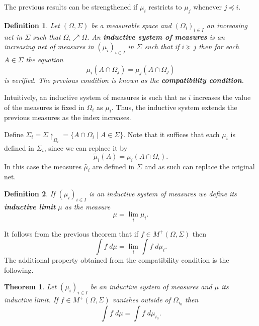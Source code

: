 \documentclass[%
 aip,
 amsmath,amssymb,
 reprint,%
jmp]{revtex4-2}
\newtheorem{theorem}{Theorem}[section]
\newtheorem*{definition}{Definition}
\begin{document}
The previous results can be strengthened if $\mu_{i}$ restricts to $\mu_{j}$ whenever $j \preceq i$.

\begin{definition}
Let $(\Omega,\Sigma)$ be a measurable space and $(\Omega_{i})_{i\in I}$ an increasing net in $\Sigma$ such that $\Omega_{i}\nearrow\Omega$. An \textbf{inductive system of measures} is an increasing net of measures in $(\mu_{i})_{i\in I}$ in $\Sigma$ such that if $i \succeq j$ then for each $A\in\Sigma$ the equation
\begin{equation*}
    \mu_{i}(A\cap\Omega_{j}) = \mu_{j}(A\cap\Omega_{j})
\end{equation*}
is verified. The previous condition is known as the \textbf{compatibility condition}.
\end{definition}

Intuitively, an inductive system of measures is such that as $i$ increases the value of the measures is fixed in $\Omega_{i}$ as $\mu_{i}$. Thus, the inductive system extends the previous measures as the index increases.

Define $\Sigma_{i} = \Sigma\restriction_{\Omega_{i}} = \{A\cap\Omega_{i}\;|\;A\in\Sigma\}$. Note that it suffices that each $\mu_{i}$ is defined in $\Sigma_{i}$, since we can replace it by
\begin{equation*}
    \tilde{\mu}_{i}(A) = \mu_{i}(A\cap\Omega_{i}).
\end{equation*}
In this case the measures $\tilde{\mu_{i}}$ are defined in $\Sigma$ and as such can replace the original net.

\begin{definition}
If $(\mu_{i})_{i\in I}$ is an inductive system of measures we define its \textbf{inductive limit} $\mu$ as the measure
\begin{equation*}
    \mu = \lim_{i}\mu_{i}.
\end{equation*}
\end{definition}

It follows from the previous theorem that if $f\in M^{+}(\Omega,\Sigma)$ then
\begin{equation*}
    \int f\;d\mu = \lim_{i}\int f\;d\mu_{i}.
\end{equation*}
The additional property obtained from the compatibility condition is the following.

\begin{theorem}\label{TeoSistemaInductivoMedidas}
Let $(\mu_{i})_{i\in I}$ be an inductive system of measures and $\mu$ its inductive limit. If $f\in M^{+}(\Omega,\Sigma)$ vanishes outside of $\Omega_{i_{0}}$ then
\begin{equation*}
    \int f\;d\mu = \int f\;d\mu_{i_{0}}.
\end{equation*}
\end{theorem}
\end{document}
